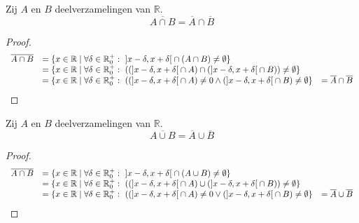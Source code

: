 \documentclass[main.tex]{subfiles}
\begin{document}
\begin{st}
  Zij $A$ en $B$ deelverzamelingen van $\mathbb{R}$.
  \[ \overline{A \cap B} = \overline{A} \cap \overline{B} \]

  \begin{proof}
    \[
    \begin{array}{rll}
      \overline{A \cap B} 
      &= \{ x\in \mathbb{R} \mid \forall \delta \in \mathbb{R}_{0}^{+}:\ \interval[open]{x-\delta}{ x+\delta} \cap (A \cap B) \neq \emptyset \}\\
      &= \{ x\in \mathbb{R} \mid \forall \delta \in \mathbb{R}_{0}^{+}:\ ((\interval[open]{x-\delta}{ x+\delta} \cap A) \cap (\interval[open]{x-\delta}{ x+\delta} \cap B)) \neq \emptyset \}\\
      &= \{ x\in \mathbb{R} \mid \forall \delta \in \mathbb{R}_{0}^{+}:\ ((\interval[open]{x-\delta}{ x+\delta} \cap A) \neq 0 \wedge (\interval[open]{x-\delta}{ x+\delta} \cap B) \neq \emptyset \}
      &= \overline{A} \cap \overline{B} \\
    \end{array}
    \]
  \end{proof}
\feed
{}
\end{st}

\begin{st}
  Zij $A$ en $B$ deelverzamelingen van $\mathbb{R}$.
  \[ \overline{A \cup B} = \overline{A} \cup \overline{B} \]

  \begin{proof}
    \[
    \begin{array}{rll}
      \overline{A \cap B} 
      &= \{ x\in \mathbb{R} \mid \forall \delta \in \mathbb{R}_{0}^{+}:\ \interval[open]{x-\delta}{ x+\delta} \cap (A \cup B) \neq \emptyset \}\\
      &= \{ x\in \mathbb{R} \mid \forall \delta \in \mathbb{R}_{0}^{+}:\ ((\interval[open]{x-\delta}{ x+\delta} \cap A) \cup (\interval[open]{x-\delta}{ x+\delta} \cap B)) \neq \emptyset \}\\
      &= \{ x\in \mathbb{R} \mid \forall \delta \in \mathbb{R}_{0}^{+}:\ ((\interval[open]{x-\delta}{ x+\delta} \cap A) \neq 0 \vee (\interval[open]{x-\delta}{ x+\delta} \cap B) \neq \emptyset \}
      &= \overline{A} \cup \overline{B} \\
    \end{array}
    \]
  \end{proof}
\feed
{}
\end{st}
\end{document}
